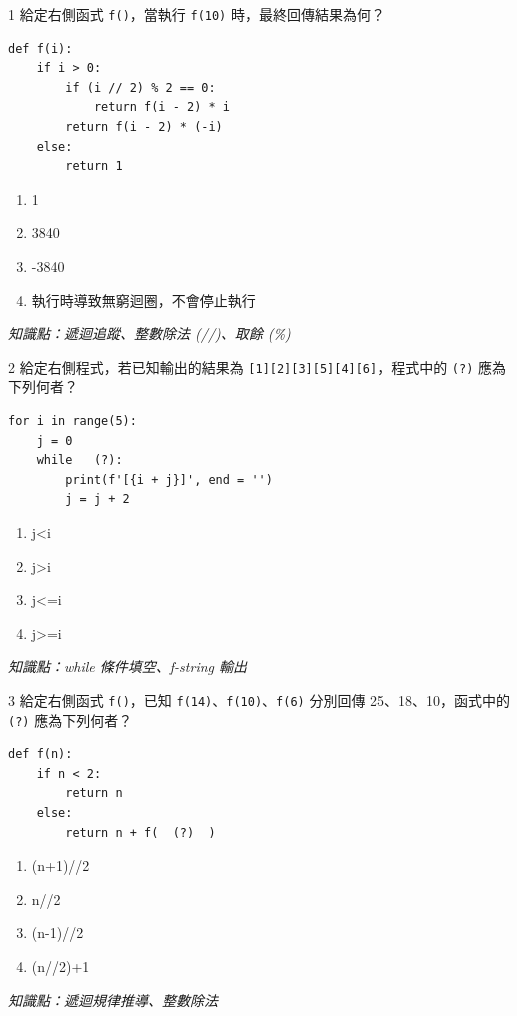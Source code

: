 
\newcommand{\qskill}[1]{%
  \par\vspace{2pt}
  {\small\color{notebar}\textit{知識點：#1}}%
  \vspace{2pt}%
}

\newcommand{\qchoices}[4]{%
  \vspace{3pt}
  \begin{enumerate}[label=(\Alph*), itemsep=1pt, topsep=1pt,
                    leftmargin=2.2em, parsep=0pt]
    \item #1
    \item #2
    \item #3
    \item #4
  \end{enumerate}
}

\begin{qbox}{1}
給定右側函式 \texttt{f()}，當執行 \texttt{f(10)} 時，最終回傳結果為何？

\begin{verbatim}
def f(i):
    if i > 0:
        if (i // 2) % 2 == 0:
            return f(i - 2) * i
        return f(i - 2) * (-i)
    else:
        return 1
\end{verbatim}

\qchoices{1}{3840}{-3840}{執行時導致無窮迴圈，不會停止執行}
\qskill{遞迴追蹤、整數除法 (//)、取餘 (\%)}
\end{qbox}

\medskip

\begin{qbox}{2}
給定右側程式，若已知輸出的結果為 \texttt{[1][2][3][5][4][6]}，程式中的 \texttt{(?)} 應為下列何者？

\begin{verbatim}
for i in range(5):
    j = 0
    while   (?):
        print(f'[{i + j}]', end = '')
        j = j + 2
\end{verbatim}

\qchoices{j<i}{j>i}{j<=i}{j>=i}
\qskill{while 條件填空、f-string 輸出}
\end{qbox}

\medskip

\begin{qbox}{3}
給定右側函式 \texttt{f()}，已知 \texttt{f(14)}、\texttt{f(10)}、\texttt{f(6)} 分別回傳 25、18、10，函式中的 \texttt{(?)} 應為下列何者？

\begin{verbatim}
def f(n):
    if n < 2:
        return n
    else:
        return n + f(  (?)  )
\end{verbatim}

\qchoices{(n+1)//2}{n//2}{(n-1)//2}{(n//2)+1}
\qskill{遞迴規律推導、整數除法}
\end{qbox}

